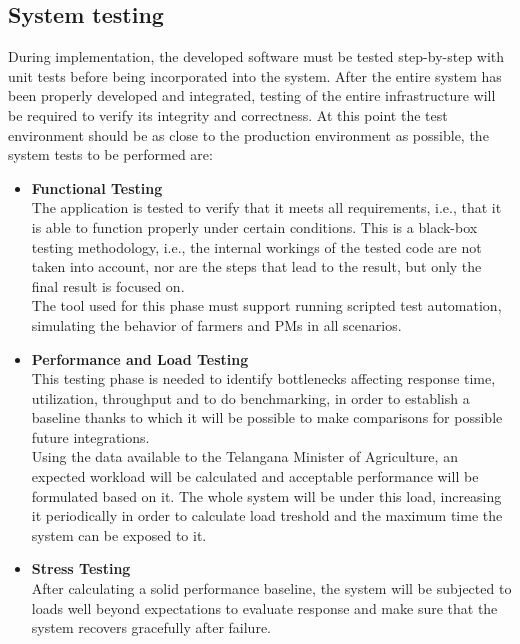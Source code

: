\documentclass[10pt]{article} %
\begin{document}
\subsection{System testing}
During implementation, the developed software must be tested step-by-step with unit tests before 
being incorporated into the system. After the entire system has been properly developed and integrated, 
testing of the entire infrastructure will be required to verify its integrity and correctness. 
At this point the test environment should be as close to the production environment as possible, 
the system tests to be performed are\cite{slides}:
\begin{itemize}
    \item \textbf{Functional Testing}\\The application is tested to verify that it meets all 
    requirements, i.e., that it is able to function properly under certain conditions. 
    This is a black-box testing methodology, i.e., the internal workings of the tested code 
    are not taken into account, nor are the steps that lead to the result, but only the final result is focused on.\\
    The tool used for this phase must support running scripted test automation, simulating the 
    behavior of farmers and PMs in all scenarios. 
    \item \textbf{Performance and Load Testing}\\This testing phase is needed to identify bottlenecks affecting response time, utilization,
    throughput and to do benchmarking, in order to establish a baseline thanks to which it will be 
    possible to make comparisons for possible future integrations.\\
    Using the data available to the Telangana Minister of Agriculture, an expected workload will be calculated 
    and acceptable performance will be formulated based on it. The whole system will be under this load, increasing it 
    periodically in order to calculate load treshold and the maximum time the system can be exposed to it. 
    \item \textbf{Stress Testing}\\After calculating a solid performance baseline, the system will be subjected to 
    loads well beyond expectations to evaluate response and make sure that the system recovers gracefully after failure.
\end{itemize}
\end{document}
